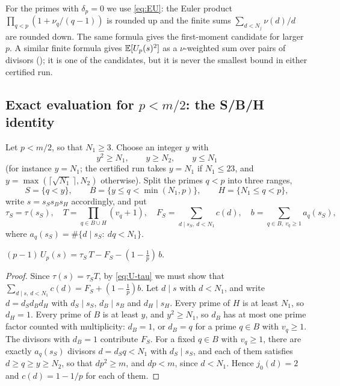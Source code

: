 For the primes with $\delta_p=0$ we use \eqref{eq:EU}: the Euler product $\prod_{q<p}(1+\nu_q/(q-1))$ is rounded up and
the finite sums $\sum_{d<N_j}\nu(d)/d$ are rounded down. The same formula gives the first-moment candidate for larger
$p$. A similar finite formula gives $\mathbb{E}[U_p(s)^2]$ as a $\nu$-weighted sum over pairs of divisors
(); it is one of the candidates, but it is never the smallest bound in either certified run.

\subsection{Exact evaluation for $p<m/2$: the S/B/H identity}\label{sec:SBH}

Let $p<m/2$, so that $N_1\ge3$. Choose an integer $y$ with
\begin{equation}\label{eq:ycond}
  y^2\ge N_1,\qquad y\ge N_2,\qquad y\le N_1
\end{equation}
(for instance $y=N_1$; the certified run takes $y=N_1$ if $N_1\le23$, and $y=\max(\lceil\sqrt{N_1}\,\rceil,N_2)$
otherwise). Split the primes $q<p$ into three ranges,
\[
  S=\{q<y\},\qquad B=\{y\le q<\min(N_1,p)\},\qquad H=\{N_1\le q<p\},
\]
write $s=s_Ss_Bs_H$ accordingly, and put
\[
  \tau_S=\tau(s_S),\quad T=\prod_{q\in B\cup H}(v_q+1),\quad F_S=\sum_{d\mid s_S,\ d<N_1}c(d),\quad
  b=\sum_{q\in B,\ v_q\ge1}a_q(s_S),
\]
where $a_q(s_S)=\#\{d\mid s_S:\ dq<N_1\}$.

\begin{lemma}\label{lem:SBH}
$(p-1)\,U_p(s)=\tau_S\,T-F_S-(1-\frac1p)\,b$.
\end{lemma}

\begin{proof}
Since $\tau(s)=\tau_ST$, by \eqref{eq:U-tau} we must show that $\sum_{d\mid s,\,d<N_1}c(d)=F_S+(1-\frac1p)b$. Let
$d\mid s$ with $d<N_1$, and write $d=d_Sd_Bd_H$ with $d_S\mid s_S$, $d_B\mid s_B$ and $d_H\mid s_H$. Every prime of $H$
is at least $N_1$, so $d_H=1$. Every prime of $B$ is at least $y$, and $y^2\ge N_1$, so $d_B$ has at most one prime
factor counted with multiplicity: $d_B=1$, or $d_B=q$ for a prime $q\in B$ with $v_q\ge1$. The divisors with
$d_B=1$ contribute $F_S$. For a fixed $q\in B$ with $v_q\ge1$, there are exactly $a_q(s_S)$ divisors $d=d_Sq<N_1$
with $d_S\mid s_S$, and each of them satisfies $d\ge q\ge y\ge N_2$, so that $dp^2\ge m$, and $dp<m$, since $d<N_1$.
Hence $j_0(d)=2$ and $c(d)=1-1/p$ for each of them.
\end{proof}

